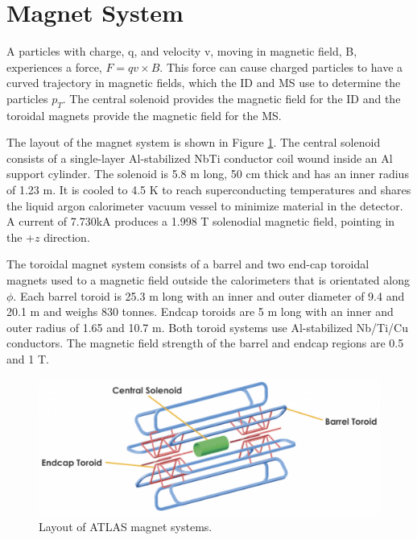 \section{Magnet System}
A particles with charge, q, and velocity v, moving in magnetic field, B, experiences a force, $F= qv\times B$. This force can cause charged particles to have a curved trajectory in magnetic fields, which the ID and MS use to determine the particles $p_{T}$. The central solenoid provides the magnetic field for the ID and the toroidal magnets provide the magnetic field for the MS.

The layout of the magnet system is shown in Figure \ref{fig:atlas_magnets}. The central solenoid consists of a single-layer Al-stabilized NbTi conductor coil wound inside an Al support cylinder. The solenoid is 5.8 m long, 50 cm thick and has an inner radius of 1.23 m. It is cooled to 4.5 K to reach superconducting temperatures and shares the liquid argon calorimeter vacuum vessel to minimize material in the detector. A current of 7.730kA produces a 1.998 T solenodial magnetic field, pointing in the +$z$ direction. 

The toroidal magnet system consists of a barrel and two end-cap toroidal magnets used to a magnetic field outside the calorimeters that is orientated along $\phi$. Each barrel toroid is 25.3 m long with an inner and outer diameter of 9.4 and 20.1 m and weighs 830 tonnes. Endcap toroids are 5 m long with an inner and outer radius of 1.65 and 10.7 m. Both toroid systems use Al-stabilized Nb/Ti/Cu conductors. The magnetic field strength of the barrel and endcap regions are 0.5 and 1 T.

\begin{figure}[h!]
  \centering
  \includegraphics[width=\hsize]{figures/Detector/atlas_magnets.png}
  \caption{Layout of ATLAS magnet systems.} 
  \label{fig:atlas_magnets}
\end{figure}
\FloatBarrier


